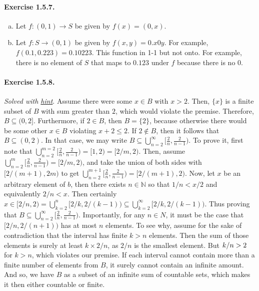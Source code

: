 \documentclass{article}
\newcommand{\N}{\mathbb{N}}
\begin{document}
\paragraph{Exercise 1.5.7.}
\begin{enumerate}[(a)]
    \item Let $f:(0,1) \to S$ be given by $f(x) = (0,x)$.
    \item Let $f:S \to (0,1)$ be given by $f(x,y) = 0.x0y$. For example, $f(0.1,0.223) = 0.10223$. This function in 1-1 but not onto. For example, there is no element of $S$ that maps to $0.123$ under $f$ because there is no 0.
\end{enumerate}

\paragraph{Exercise 1.5.8.}
\textit{Solved with \href{https://math.stackexchange.com/a/2876333/1027565}{hint}}. Assume there were some $x\in B$ with $x>2$. Then, $\{x\}$ is a finite subset of $B$ with sum greater than $2$, which would violate the premise. Therefore, $B \subseteq (0,2]$. Furthermore, if $2\in B$, then $B = \{2\}$, because otherwise there would be some other $x\in B$ violating $x+2 \leq 2$. If $2\notin B$, then it follows that $B\subseteq (0,2)$. In that case, we may write $B \subseteq \bigcup_{n=2}^\infty [\frac{2}{n},\frac{2}{n-1})$. To prove it, first note that $\bigcup_{n=2}^{m=2} [\frac{2}{n},\frac{2}{n-1}) = [1, 2) = [2/m, 2)$. Then, assume $\bigcup_{n=2}^m [\frac{2}{n},\frac{2}{n-1}) = [2/m, 2)$, and take the union of both sides with $[2/(m+1), 2m)$ to get $\bigcup_{n=2}^{m+1} [\frac{2}{n},\frac{2}{n-1}) = [2/(m+1), 2)$. Now, let $x$ be an arbitrary element of $b$, then there exists $n\in \N$ so that $1/n < x/2$ and equivalently $2/n < x$. Then certainly $x\in [2/n, 2) = \bigcup_{k=2}^n [2/k, 2/(k-1)) \subseteq \bigcup_{k=2}^\infty [2/k, 2/(k-1))$. Thus proving that $B \subseteq \bigcup_{n=2}^\infty [\frac{2}{n},\frac{2}{n-1})$. Importantly, for any $n\in N$, it must be the case that $[2/n, 2/(n+1))$ has at most $n$ elements. To see why, assume for the sake of contradiction that the interval has finite $k>n$ elements. Then the sum of those elements is surely at least $k\times 2/n$, as $2/n$ is the smallest element. But $k\time 2/n > 2$ for $k>n$, which violates our premise. If each interval cannot contain more than a finite number of elements from $B$, it surely cannot contain an infinite amount. And so, we have $B$ as a subset of an infinite sum of countable sets, which makes it then either countable or finite.
\end{document}
